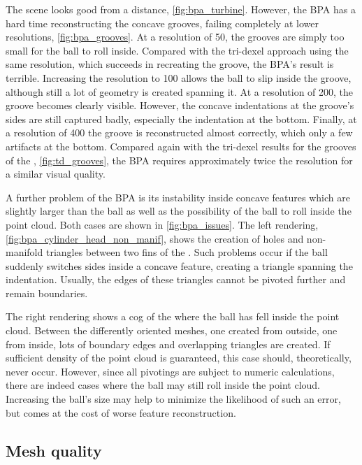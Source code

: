 The \turbine scene looks good from a distance, \cf \cref{fig:bpa_turbine}.
However, the BPA has a hard time reconstructing the concave grooves, failing completely at lower resolutions, \cf \cref{fig:bpa_grooves}.
At a resolution of 50, the grooves are simply too small for the ball to roll inside.
Compared with the tri-dexel approach using the same resolution, which succeeds in recreating the groove, the BPA's result is terrible.
Increasing the resolution to 100 allows the ball to slip inside the groove, although still a lot of geometry is created spanning it.
At a resolution of 200, the groove becomes clearly visible.
However, the concave indentations at the groove's sides are still captured badly, especially the indentation at the bottom.
Finally, at a resolution of 400 the groove is reconstructed almost correctly, which only a few artifacts at the bottom.
Compared again with the tri-dexel results for the grooves of the \turbine, \cf \cref{fig:td_grooves}, the BPA requires approximately twice the resolution for a similar visual quality.

A further problem of the BPA is its instability inside concave features which are slightly larger than the ball as well as the possibility of the ball to roll inside the point cloud.
Both cases are shown in \cref{fig:bpa_issues}.
The left rendering, \cref{fig:bpa_cylinder_head_non_manif}, shows the creation of holes and non-manifold triangles between two fins of the \cylinderhead.
Such problems occur if the ball suddenly switches sides inside a concave feature, creating a triangle spanning the indentation.
Usually, the edges of these triangles cannot be pivoted further and remain boundaries.

The right rendering shows a cog of the \turbine where the ball has fell inside the point cloud.
Between the differently oriented meshes, one created from outside, one from inside, lots of boundary edges and overlapping triangles are created.
If sufficient density of the point cloud is guaranteed, this case should, theoretically, never occur.
However, since all pivotings are subject to numeric calculations, there are indeed cases where the ball may still roll inside the point cloud.
Increasing the ball's size may help to minimize the likelihood of such an error, but comes at the cost of worse feature reconstruction.


\subsection{Mesh quality}

